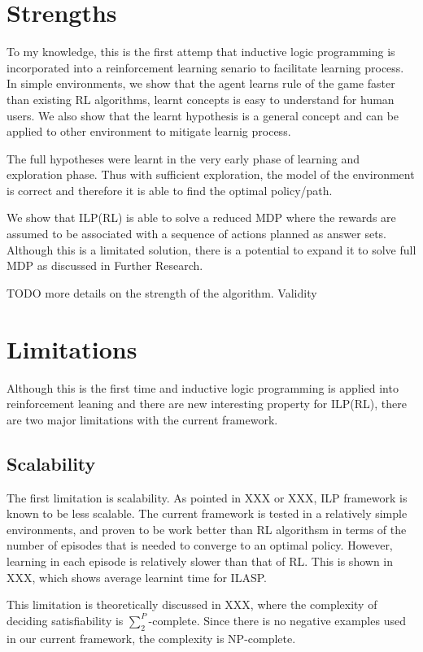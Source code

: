 \section{Strengths}
\label{strengths}

To my knowledge, this is the first attemp that inductive logic programming is incorporated into a reinforcement learning senario to facilitate learning process.
In simple environments, we show that the agent learns rule of the game faster than existing RL algorithms, learnt concepts is easy to understand for human users.
We also show that the learnt hypothesis is a general concept and can be applied to other environment to mitigate learnig process.

The full hypotheses were learnt in the very early phase of learning and exploration phase. Thus with sufficient exploration, the model of the environment is correct
and therefore it is able to find the optimal policy/path. 

We show that ILP(RL) is able to solve a reduced MDP where the rewards are assumed to be associated with a sequence of actions planned as answer sets.
Although this is a limitated solution, there is a potential to expand it to solve full MDP as discussed in Further Research. 

TODO more details on the strength of the algorithm. 
Validity

\section{Limitations}

Although this is the first time and inductive logic programming is applied into reinforcement leaning and there are new interesting property for ILP(RL),
there are two major limitations with the current framework.

\subsection{Scalability}
The first limitation is scalability. As pointed in XXX or XXX,
ILP framework is known to be less scalable. The current framework is tested in a relatively simple environments, 
and proven to be work better than RL algorithsm in terms of the number of episodes that is needed to converge to an optimal policy.
However, learning in each episode is relatively slower than that of RL. 
This is shown in XXX, which shows average learnint time for ILASP. 

This limitation is theoretically discussed in XXX, where the complexity of deciding satisfiability is 
$\sum_{2}^{P}$-complete. Since there is no negative examples used in our current framework, the complexity is NP-complete.

